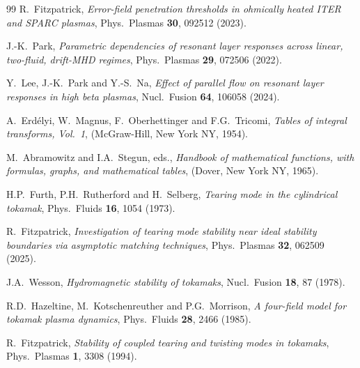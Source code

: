 \documentclass[12pt,prb,aps]{revtex4-1}
\begin{document}
\begin{thebibliography}{99}
 R.~Fitzpatrick, {\em Error-field penetration thresholds in ohmically heated ITER and SPARC plasmas}, Phys.\ Plasmas {\bf 30}, 092512 (2023).

 J.-K.~Park, {\em Parametric dependencies of resonant layer responses across linear, two-fluid, drift-MHD
regimes}, Phys.\ Plasmas {\bf 29}, 072506 (2022).

 Y.~Lee, J.-K.~Park and Y.-S.~Na, {\em Effect of parallel flow on resonant layer responses in high beta plasmas}, Nucl.\ Fusion {\bf 64}, 106058 (2024).

 A.~Erd\'{e}lyi, W.~Magnus, F.~Oberhettinger and F.G.~Tricomi, {\em Tables of integral transforms, Vol.~1}, (McGraw-Hill, New York NY, 1954).

 M.~Abramowitz and I.A.~Stegun, eds., {\em Handbook of mathematical functions, with formulas, graphs, and mathematical tables},  (Dover, New York NY, 1965).

 H.P.~Furth, P.H.~Rutherford and H.~Selberg, {\em Tearing mode in the cylindrical tokamak}, Phys.\  Fluids {\bf 16}, 1054 (1973). 

 R.~Fitzpatrick, {\em Investigation of tearing mode stability near ideal stability boundaries via asymptotic matching techniques},  Phys.\ Plasmas {\bf 32}, 062509 (2025). 

 J.A.~Wesson, {\em Hydromagnetic stability of tokamaks}, Nucl.\ Fusion {\bf 18}, 87 (1978).

 R.D.~Hazeltine, M.~Kotschenreuther and P.G.~Morrison, {\em A four-field model for tokamak plasma dynamics}, Phys.\ Fluids {\bf 28}, 2466 (1985).

 R.~Fitzpatrick, {\em Stability of coupled tearing and twisting modes in tokamaks}, Phys.\ Plasmas {\bf 1}, 3308 (1994).






\end{thebibliography}
\end{document}
